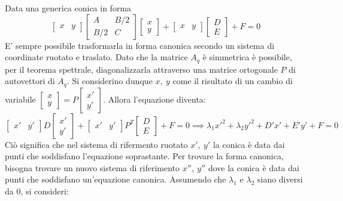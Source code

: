 \documentclass{article}
\begin{document}
        \vspace{10pt}
        Data una generica conica in forma
        \[
            \begin{bmatrix} x & y\end{bmatrix} \begin{bmatrix} A & B/2 \\ B/2 & C \end{bmatrix} \begin{bmatrix} x \\ y \end{bmatrix} + \begin{bmatrix} x & y \end{bmatrix} \begin{bmatrix} D \\ E \end{bmatrix} + F = 0
        \]
        E' sempre possibile trasformarla in forma canonica secondo un sistema di coordinate ruotato e traslato. Dato che la matrice $A_q$ è simmetrica è possibile, per il teorema spettrale, diagonalizzarla attraverso una matrice ortogonale $P$ di autovettori di $A_q$. Si considerino dunque $x,\: y$ come il risultato di un cambio di variabile $\begin{bmatrix} x \\ y \end{bmatrix} = P \begin{bmatrix} x' \\ y' \end{bmatrix}$.
        Allora l'equazione diventa:
        \[
            \begin{bmatrix} x' & y' \end{bmatrix} D \begin{bmatrix} x' \\ y' \end{bmatrix} + \begin{bmatrix} x' & y' \end{bmatrix} P^{T} \begin{bmatrix} D \\ E \end{bmatrix} + F = 0 \implies \lambda_1 x'^2 + \lambda_2 y'^2 + D' x' + E' y' + F = 0
        \]
        Ciò significa che nel sistema di rifermento ruotato $x', \: y'$ la conica è data dai punti che soddisfano l'equazione soprastante. Per trovare la forma canonica, bisogna trovare un nuovo sistema di riferimento $x'', \: y''$ dove la conica è data dai punti che soddisfano un'equazione canonica.
        Assumendo che $\lambda_1$ e $\lambda_2$ siano diversi da 0, si consideri:
\end{document}
